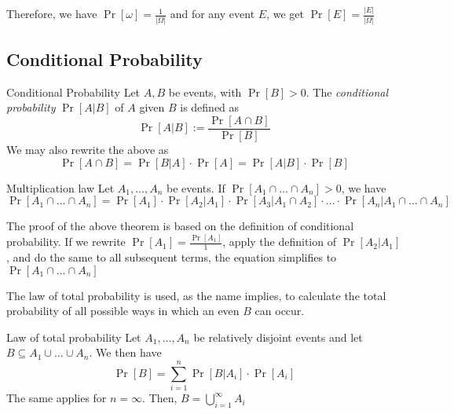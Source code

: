 \vspace{1cm}
\begin{center}
\end{center}
\vspace{1cm}

Therefore, we have $\Pr[\omega] = \displaystyle \frac{1}{|\Omega|}$ and for any event $E$, we get $\displaystyle \Pr[E] = \frac{|E|}{|\Omega|}$


\newpage
\subsection{Conditional Probability}
\setcounter{all}{8}
\begin{definition}[]{Conditional Probability}
    Let $A, B$ be events, with $\Pr[B] > 0$. The \textit{conditional probability} $\Pr[A|B]$ of $A$ given $B$ is defined as
    \[
        \Pr[A|B] := \frac{\Pr[A \cap B]}{\Pr[B]}
    \]
    We may also rewrite the above as
    \[
        \Pr[A \cap B] = \Pr[B|A] \cdot \Pr[A] = \Pr[A|B] \cdot \Pr[B]
    \]
\end{definition}

\setcounter{all}{10}
\begin{theorem}[]{Multiplication law}
    Let $A_1, \ldots, A_n$ be events. If $\Pr[A_1 \cap \ldots \cap A_n] > 0$, we have
    \[
        \Pr[A_1 \cap \ldots \cap A_n] = \Pr[A_1] \cdot \Pr[A_2|A_1] \cdot \Pr[A_3|A_1 \cap A_2] \cdot \ldots \cdot \Pr[A_n|A_1 \cap \ldots \cap A_n]
    \]
\end{theorem}

The proof of the above theorem is based on the definition of conditional probability. If we rewrite $\Pr[A_1] = \frac{\Pr[A_1]}{1}$, apply the definition of $\Pr[A_2 | A_1]$, and do the same to all subsequent terms, the equation simplifies to $\Pr[A_1 \cap \ldots \cap A_n]$


 The law of total probability is used, as the name implies, to calculate the total probability of all possible ways in which an even $B$ can occur.
\setcounter{all}{13}
\begin{theorem}[]{Law of total probability}
    Let $A_1, \ldots, A_n$ be relatively disjoint events and let $B \subseteq A_1 \cup \ldots \cup A_n$. We then have
    \[
        \Pr[B] = \sum_{i = 1}^{n} \Pr[B|A_i] \cdot \Pr[A_i]
    \]
    The same applies for $n = \infty$. Then, $B = \bigcup_{i = 1}^{\infty} A_i$
\end{theorem}


